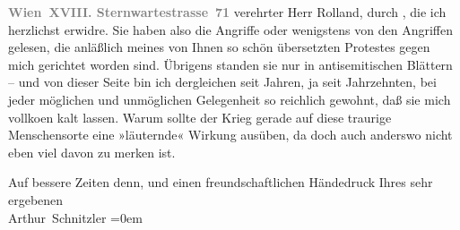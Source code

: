 \pstart
           \textcolor{gray}{\textbf{Wien XVIII. Sternwartestrasse 71}}\pend
           \vspace{0.5em}
\pstart
           verehrter Herr Rolland, durch \label{K_L04213-1v}\label{K_L04213-1}, die ich herzlichst
               erwidre. Sie haben also die Angriffe oder wenigstens von den Angriffen gelesen, die
               anläßlich meines von Ihnen so schön übersetzten Protestes gegen mich gerichtet worden
               sind. Übrigens standen sie nur in antisemitischen Blättern – und von dieser Seite
               bin ich dergleichen seit Jahren, ja seit Jahrzehnten, bei jeder möglichen und {\pb}unmöglichen Gelegenheit so reichlich gewohnt, daß sie mich vollko{\geminationm}en kalt lassen. Warum sollte der Krieg gerade auf diese
               traurige Menschensorte eine »läuternde« Wirkung ausüben, da doch auch anderswo nicht
               eben viel davon zu merken ist.\pend
           
\pstart
           Auf bessere Zeiten denn, und einen freundschaftlichen Händedruck Ihres sehr
               ergebenen {\\[\baselineskip]}\spacefill\mbox{Arthur Schnitzler}\pend
           \leftskip=0em{}\endnumbering{}
\begin{anhang}
\end{anhang}\newcommand{\dateiname}{L04213}\newcommand{\titel}{Arthur Schnitzler an Romain Rolland, 11. 2. 1915}\newcommand{\editorInnen}{Selma Jahnke und Martin Anton Müller}
